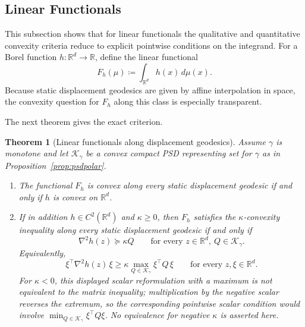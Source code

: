 \documentclass{article}
\newtheorem{theorem}{Theorem}[section]
\newcommand{\R}{\mathbb{R}}
\newcommand{\cK}{\mathcal K_\gamma}
\begin{document}
\subsection{Linear Functionals}
This subsection shows that for linear functionals the qualitative and quantitative convexity criteria reduce to explicit pointwise conditions on the integrand.
For a Borel function $h:\R^d\to\R$, define the linear functional
$$
F_h(\mu)\coloneqq \int_{\R^d} h(x)\,d\mu(x).
$$
Because static displacement geodesics are given by affine interpolation in
space, the convexity question for $F_h$ along this class is especially
transparent.

The next theorem gives the exact criterion.
\begin{theorem}[Linear functionals along displacement geodesics]
\label{thm:linearconvex}
Assume $\gamma$ is monotone and let $\cK$ be a convex compact PSD representing set for $\gamma$ as in Proposition~\ref{prop:psdpolar}.
\begin{enumerate}
\item The functional $F_h$ is convex along every static displacement geodesic
if and only if $h$ is convex on $\R^d$.
\item If in addition $h\in C^2(\R^d)$ and $\kappa\ge0$, then $F_h$ satisfies
the $\kappa$-convexity inequality along every static displacement geodesic if
and only if
$$
\nabla^2 h(z)\succeq \kappa Q
\qquad
\text{for every }z\in\R^d,\ Q\in\cK.
$$
Equivalently,
$$
\xi^\top \nabla^2 h(z)\,\xi
\ge
\kappa\max_{Q\in\cK}\xi^\top Q\,\xi
\qquad
\text{for every }z,\xi\in\R^d.
$$
For $\kappa<0$, this displayed scalar reformulation with a maximum is not equivalent to the matrix inequality; multiplication by the negative scalar reverses the extremum, so the corresponding pointwise scalar condition would involve $\min_{Q\in\cK}\xi^\top Q\xi$. No equivalence for negative $\kappa$ is asserted here.
\end{enumerate}
\end{theorem}
\end{document}

